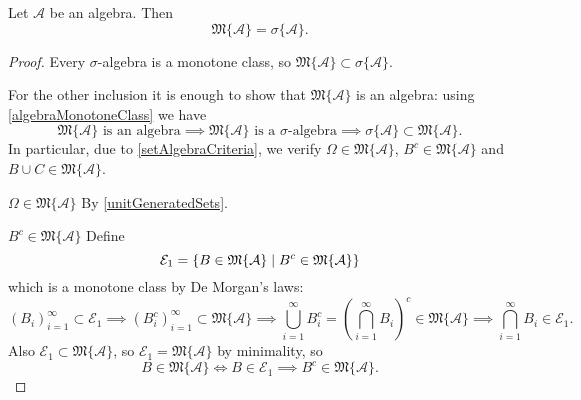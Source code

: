 \begin{proposition} \label{monotoneClassTheorem}
Let $\mathcal{A}$ be an algebra. Then
\[ \mathfrak{M}\{\mathcal{A}\} = \sigma\{\mathcal{A}\}. \]
\end{proposition}
\begin{proof}
Every $\sigma$-algebra is a monotone class, so $\mathfrak{M}\{\mathcal{A}\} \subset \sigma\{\mathcal{A}\}$.

For the other inclusion it is enough to show that $\mathfrak{M}\{\mathcal{A}\}$ is an algebra: using \ref{algebraMonotoneClass} we have
\[ \text{$\mathfrak{M}\{\mathcal{A}\}$ is an algebra} \implies \text{$\mathfrak{M}\{\mathcal{A}\}$ is a $\sigma$-algebra} \implies \sigma\{\mathcal{A}\}\subset\mathfrak{M}\{\mathcal{A}\}. \]
In particular, due to \ref{setAlgebraCriteria}, we verify $\Omega\in \mathfrak{M}\{\mathcal{A}\}$, $B^c \in \mathfrak{M}\{\mathcal{A}\}$ and $B\cup C \in \mathfrak{M}\{\mathcal{A}\}$.

$\boxed{\Omega\in \mathfrak{M}\{\mathcal{A}\}}$ By \ref{unitGeneratedSets}.

$\boxed{B^c \in \mathfrak{M}\{\mathcal{A}\}}$ Define
\[ \mathcal{E}_1 = \setbuilder{B\in\mathfrak{M}\{\mathcal{A}\}}{B^c\in\mathfrak{M}\{\mathcal{A}\}} \]
which is a monotone class by De Morgan's laws:
\[ (B_i)_{i=1}^\infty\subset \mathcal{E}_1 \implies (B_i^c)_{i=1}^\infty\subset \mathfrak{M}\{\mathcal{A}\} \implies \bigcup_{i=1}^\infty B_i^c = \left(\bigcap_{i=1}^\infty B_i\right)^c \in\mathfrak{M}\{\mathcal{A}\} \implies \bigcap_{i=1}^\infty B_i \in \mathcal{E}_1. \]
Also $\mathcal{E}_1\subset \mathfrak{M}\{\mathcal{A}\}$, so $\mathcal{E}_1 = \mathfrak{M}\{\mathcal{A}\}$ by minimality, so
\[ B\in\mathfrak{M}\{\mathcal{A}\} \iff B\in\mathcal{E}_1 \implies B^c\in\mathfrak{M}\{\mathcal{A}\}. \]


\end{proof}

